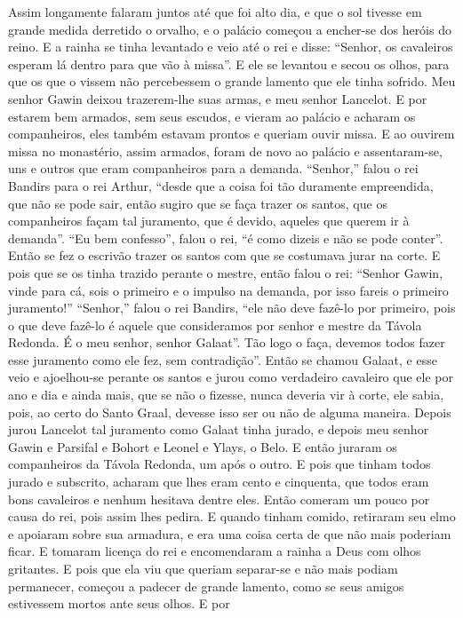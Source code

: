 Assim longamente falaram juntos até que foi alto dia, e que o sol tivesse em
grande medida derretido o orvalho, e o palácio começou a encher-se dos heróis
do reino. E a rainha se tinha levantado e veio até o rei e disse: “Senhor, os
cavaleiros esperam lá dentro para que vão à missa”. E ele se levantou e secou
os olhos, para que os que o vissem não percebessem o grande lamento que ele
tinha sofrido. Meu senhor Gawin deixou trazerem-lhe suas armas, e meu senhor
Lancelot. E por estarem bem armados, sem seus escudos, e vieram ao
palácio e acharam os companheiros, eles também estavam prontos e queriam ouvir
missa. E ao ouvirem missa no monastério, assim armados, foram de novo ao
palácio e assentaram-se, uns e outros que eram companheiros para a demanda.
“Senhor,” falou o rei Bandirs para o rei Arthur, “desde que a coisa foi tão
duramente empreendida, que não se pode sair, então sugiro que se faça trazer os
santos, que os companheiros façam tal juramento, que é devido, aqueles que
querem ir à demanda”. “Eu bem confesso”, falou o rei, “é como dizeis e não se
pode conter”. Então se fez o escrivão trazer os santos com que se costumava
jurar na corte. E pois que se os tinha trazido perante o mestre, então falou o
rei: “Senhor Gawin, vinde para cá, sois o primeiro e o impulso na demanda, por
isso fareis o primeiro juramento!” “Senhor,” falou o rei Bandirs, “ele não
deve fazê-lo por primeiro, pois o que deve fazê-lo é aquele que consideramos
por senhor e mestre da Távola Redonda. É o meu senhor, senhor Galaat”. Tão logo
o faça, devemos todos fazer esse juramento como ele fez, sem contradição”.
Então se chamou Galaat, e esse veio e ajoelhou-se perante os santos e jurou
como verdadeiro cavaleiro que ele por ano e dia e ainda mais, que se não o
fizesse, nunca deveria vir à corte, ele sabia, pois, ao certo do Santo Graal,
devesse isso ser ou não de alguma maneira. Depois jurou Lancelot tal
juramento como Galaat tinha jurado, e depois meu senhor Gawin e Parsifal e
Bohort e Leonel e Ylays, o Belo. E então juraram os companheiros da
Távola Redonda, um após o outro. E pois que tinham todos jurado e subscrito,
acharam que lhes eram cento e cinquenta, que todos eram bons cavaleiros e
nenhum hesitava dentre eles. Então comeram um pouco por causa do rei, pois
assim lhes pedira. E quando tinham comido, retiraram seu elmo e apoiaram sobre
sua armadura, e era uma coisa certa de que não mais poderiam ficar. E tomaram
licença do rei e encomendaram a rainha a Deus com olhos gritantes. E pois que
ela viu que queriam separar-se e não mais podiam permanecer, começou a padecer
de grande lamento, como se seus amigos estivessem mortos ante seus olhos. E por
